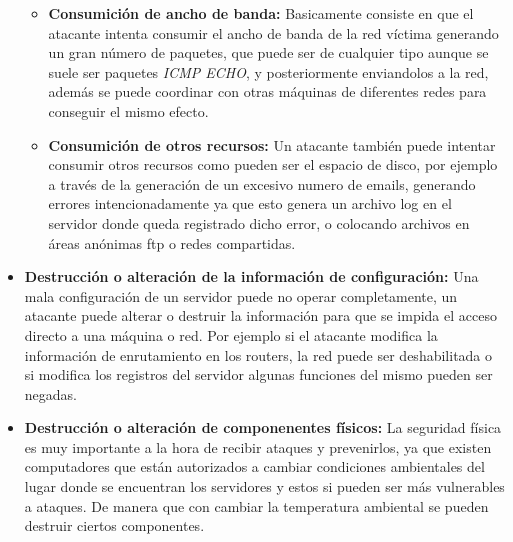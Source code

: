 \documentclass[a4paper, 10pt]{article} %
\begin{document}
\begin{itemize}
\begin{itemize}
\item \textbf{Consumición de ancho de banda:} Basicamente consiste en que el atacante intenta consumir el ancho de banda de la red víctima generando un gran número de paquetes, que puede ser de cualquier tipo aunque se suele ser paquetes \textit{ICMP ECHO}, y posteriormente enviandolos a la red, además se puede coordinar con otras máquinas de diferentes redes para conseguir el mismo efecto.
\item \textbf{Consumición de otros recursos:} Un atacante también puede intentar consumir otros recursos como pueden ser el espacio de disco, por ejemplo a través de la generación de un excesivo numero de emails, generando errores intencionadamente ya que esto genera un archivo log en el servidor donde queda registrado dicho error, o colocando archivos en áreas anónimas ftp o redes compartidas.
\end{itemize}
\item \textbf{Destrucción o alteración de la información de configuración:} Una mala configuración de un servidor puede no operar completamente, un atacante puede alterar o destruir la información para que se impida el acceso directo a una máquina o red. Por ejemplo si el atacante modifica la información de enrutamiento en los routers, la red puede ser deshabilitada o si modifica los registros del servidor algunas funciones del mismo pueden ser negadas.
\item \textbf{Destrucción o alteración de componenentes físicos:}
La seguridad física es muy importante a la hora de recibir ataques y prevenirlos, ya que existen computadores que están autorizados a cambiar condiciones ambientales del lugar donde se encuentran los servidores y estos si pueden ser más vulnerables a ataques. De manera que con cambiar la temperatura ambiental se pueden destruir ciertos componentes.
\end{itemize}
\end{document}
